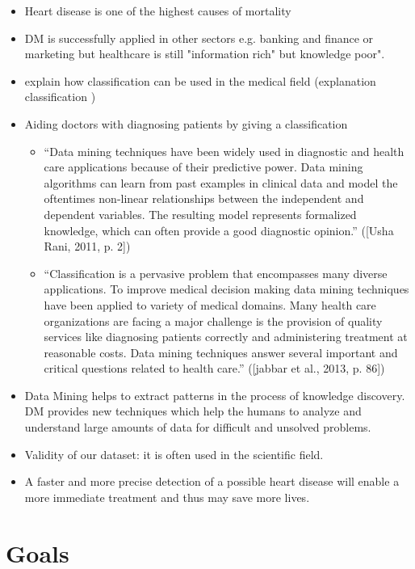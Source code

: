 \begin{itemize}
	\item Heart disease is one of the highest causes of mortality \citep{nahar2013, kavitha2016, statistischesbundesamt2020}
	\item DM is successfully applied in other sectors e.g. banking and finance or marketing \citep{keles2017} but healthcare is still "information rich" but knowledge poor". \citep{soni2011}
	\item explain how classification can be used in the medical field (explanation classification \citep{usharani2011})
	\item Aiding doctors with diagnosing patients by giving a classification
	\begin{itemize}
		\item “Data mining techniques have been widely used in diagnostic and health care applications because of their predictive power. Data mining algorithms can learn from past examples in clinical data and model the oftentimes non-linear relationships between the independent and dependent variables. The resulting model represents formalized knowledge, which can often provide a good diagnostic opinion.” ([Usha Rani, 2011, p. 2]) \citep{usharani2011}
		\item “Classification is a pervasive problem that encompasses many diverse applications. To improve medical decision making data mining techniques have been applied to variety of medical domains. Many health care organizations are facing a major challenge is the provision of quality services like diagnosing patients correctly and administering treatment at reasonable costs. Data mining techniques answer several important and critical questions related to health care.” ([jabbar et al., 2013, p. 86]) \citep{jabbar2013}
	\end{itemize}
	\item Data Mining helps to extract patterns in the process of knowledge discovery. DM provides new techniques which help the humans to analyze and understand large amounts of data for difficult and unsolved problems. \citep{usharani2011}
	\item Validity of our dataset: it is often used in the scientific field. \citep{usharani2011, aha1988, nahar2013}
	\item A faster and more precise detection of a possible heart disease will enable a more immediate treatment and thus may save more lives.
\end{itemize}

\section{Goals}

